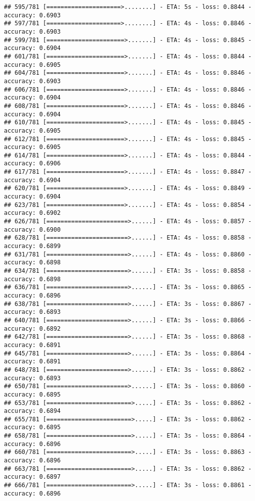 \documentclass[
]{article}
\begin{document}
\begin{verbatim}
## 595/781 [=====================>........] - ETA: 5s - loss: 0.8844 - accuracy: 0.6903
## 597/781 [=====================>........] - ETA: 4s - loss: 0.8846 - accuracy: 0.6903
## 599/781 [======================>.......] - ETA: 4s - loss: 0.8845 - accuracy: 0.6904
## 601/781 [======================>.......] - ETA: 4s - loss: 0.8844 - accuracy: 0.6905
## 604/781 [======================>.......] - ETA: 4s - loss: 0.8846 - accuracy: 0.6903
## 606/781 [======================>.......] - ETA: 4s - loss: 0.8846 - accuracy: 0.6904
## 608/781 [======================>.......] - ETA: 4s - loss: 0.8846 - accuracy: 0.6904
## 610/781 [======================>.......] - ETA: 4s - loss: 0.8845 - accuracy: 0.6905
## 612/781 [======================>.......] - ETA: 4s - loss: 0.8845 - accuracy: 0.6905
## 614/781 [======================>.......] - ETA: 4s - loss: 0.8844 - accuracy: 0.6906
## 617/781 [======================>.......] - ETA: 4s - loss: 0.8847 - accuracy: 0.6904
## 620/781 [======================>.......] - ETA: 4s - loss: 0.8849 - accuracy: 0.6904
## 623/781 [======================>.......] - ETA: 4s - loss: 0.8854 - accuracy: 0.6902
## 626/781 [=======================>......] - ETA: 4s - loss: 0.8857 - accuracy: 0.6900
## 628/781 [=======================>......] - ETA: 4s - loss: 0.8858 - accuracy: 0.6899
## 631/781 [=======================>......] - ETA: 4s - loss: 0.8860 - accuracy: 0.6898
## 634/781 [=======================>......] - ETA: 3s - loss: 0.8858 - accuracy: 0.6898
## 636/781 [=======================>......] - ETA: 3s - loss: 0.8865 - accuracy: 0.6896
## 638/781 [=======================>......] - ETA: 3s - loss: 0.8867 - accuracy: 0.6893
## 640/781 [=======================>......] - ETA: 3s - loss: 0.8866 - accuracy: 0.6892
## 642/781 [=======================>......] - ETA: 3s - loss: 0.8868 - accuracy: 0.6891
## 645/781 [=======================>......] - ETA: 3s - loss: 0.8864 - accuracy: 0.6891
## 648/781 [=======================>......] - ETA: 3s - loss: 0.8862 - accuracy: 0.6893
## 650/781 [=======================>......] - ETA: 3s - loss: 0.8860 - accuracy: 0.6895
## 653/781 [========================>.....] - ETA: 3s - loss: 0.8862 - accuracy: 0.6894
## 655/781 [========================>.....] - ETA: 3s - loss: 0.8862 - accuracy: 0.6895
## 658/781 [========================>.....] - ETA: 3s - loss: 0.8864 - accuracy: 0.6896
## 660/781 [========================>.....] - ETA: 3s - loss: 0.8863 - accuracy: 0.6896
## 663/781 [========================>.....] - ETA: 3s - loss: 0.8862 - accuracy: 0.6897
## 666/781 [========================>.....] - ETA: 3s - loss: 0.8861 - accuracy: 0.6896

\end{verbatim}
\end{document}
